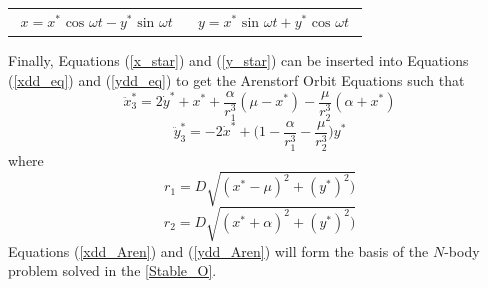\documentclass[conf]{new-aiaa}
\begin{document}
    \begin{tabularx}{\linewidth}{>{\leqnomode}XX}
        \begin{equation}
        \begin{aligned}
            x = x^* \text{ cos } \omega t - y^* \text{ sin } \omega t 
            \label{x_star}
        \end{aligned}
        \end{equation}
        &        
        \begin{equation}
        \begin{aligned}
            y = x^* \text{ sin } \omega t + y^* \text{ cos } \omega t 
            \label{y_star}
        \end{aligned}
        \end{equation}
    \end{tabularx}
    Finally, Equations (\ref{x_star}) and (\ref{y_star}) can be inserted into Equations (\ref{xdd_eq}) and (\ref{ydd_eq}) to get the Arenstorf Orbit Equations such that
    \begin{equation}
        \ddot{x}^*_3 = 2\dot{y}^* + x^* +\frac{\alpha}{r^3_1}(\mu-x^*) - \frac{\mu}{r^3_2}(\alpha+x^*)
        \label{xdd_Aren}
    \end{equation}
    \begin{equation}
        \ddot{y}^*_3 = -2\dot{x}^* + \Bigg(1 -\frac{\alpha}{r^3_1} - \frac{\mu}{r^3_2}\Bigg)y^*
        \label{ydd_Aren}
    \end{equation}
    where
    \begin{equation}
        r_1 = D\sqrt{(x^*-\mu)^2+(y^*)^2)}
        \label{r_1_D}
    \end{equation}
    \begin{equation}
        r_2 = D\sqrt{(x^*+\alpha)^2+(y^*)^2)}
        \label{r_2_D}
    \end{equation}
    Equations (\ref{xdd_Aren}) and (\ref{ydd_Aren}) will form the basis of the $N$-body problem solved in the \ref{Stable_O}.
\end{document}
